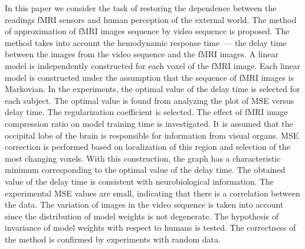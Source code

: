 \documentclass[sn-mathphys-num]{sn-jnl}%
\theoremstyle{thmstyleone}%
\theoremstyle{thmstyletwo}%
\theoremstyle{thmstylethree}%
\begin{document}
In this paper we consider the task of restoring the dependence between the readings fMRI sensors and human perception of the external world.
The method of approximation of fMRI images sequence by video sequence is proposed. 
The method takes into account the hemodynamic response time~--- the delay time between the images from the video sequence and the fMRI images. 
A linear model is independently constructed for each voxel of the fMRI image. 
Each linear model is constructed under the assumption that the sequence of fMRI images is Markovian. 
In the experiments, the optimal value of the delay time is selected for each subject. 
The optimal value is found from analyzing the plot of MSE versus delay time.
The regularization coefficient is selected. 
The effect of fMRI image compression ratio on model training time is investigated.
It is assumed that the occipital lobe of the brain is responsible for information from visual organs.
MSE correction is performed based on localization of this region and selection of the most changing voxels. 
With this construction, the graph has a characteristic minimum corresponding to the optimal value of the delay time.
The obtained value of the delay time is consistent with neurobiological information.
The experimental MSE values are small, indicating that there is a correlation between the data. 
The variation of images in the video sequence is taken into account since the distribution of model weights is not degenerate.
The hypothesis of invariance of model weights with respect to humans is tested. 
The correctness of the method is confirmed by experiments with random data.


\end{document}
